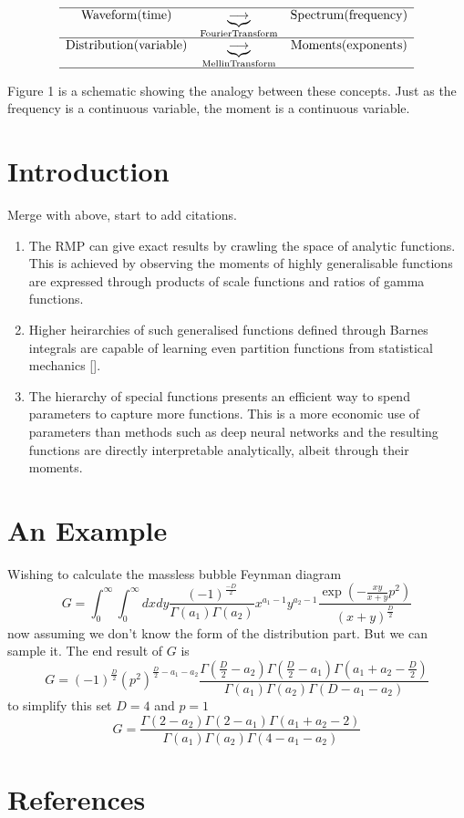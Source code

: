 \documentclass[journal=jcisd8,manuscript=article,layout=onecolumn,pdftex,floatfix,amsmath,amssymb,10pt]{achemso}
\begin{document}
\begin{equation}
\begin{matrix}
\hline
\mathrm{Waveform}(\mathrm{time}) & \underbrace{\longrightarrow}_{\mathrm{Fourier Transform}} & \mathrm{Spectrum}(\mathrm{frequency})\\
\hline
\mathrm{Distribution}(\mathrm{variable}) & \underbrace{\longrightarrow}_{\mathrm{Mellin Transform}} & \mathrm{Moments}(\mathrm{exponents}) \\
\hline
\end{matrix}
\end{equation}

Figure 1 is a schematic showing the analogy between these concepts. Just as the frequency is a continuous variable, the moment is a continuous variable. 



\section{Introduction}
{\color{red} Merge with above, start to add citations.}

\begin{enumerate}
\item The RMP can give exact results by crawling the space of analytic functions. This is achieved by observing the moments of highly generalisable functions are expressed through products of scale functions and ratios of gamma functions.
\item Higher heirarchies of such generalised functions defined through Barnes integrals are capable of learning even partition functions from statistical mechanics [\citep{I function}].
\item The hierarchy of special functions presents an efficient way to spend parameters to capture more functions. This is a more economic use of parameters than methods such as deep neural networks and the resulting functions are directly interpretable analytically, albeit through their moments.
\end{enumerate}

\section{An Example}

Wishing to calculate the massless bubble Feynman diagram
$$
G = \int_0^\infty \int_0^\infty dx dy \frac{(-1)^\frac{-D}{2}}{\Gamma(a_1)\Gamma(a_2)} x^{a_1-1}y^{a_2-1} \frac{\exp(-\frac{x y}{x+y} p^2)}{(x+y)^\frac{D}{2}}
$$
now assuming we don't know the form of the distribution part. But we can sample it. The end result of $G$ is
$$
G = (-1)^\frac{D}{2}(p^2)^{\frac{D}{2}-a_1-a_2}\frac{\Gamma(\frac{D}{2}-a_2)\Gamma(\frac{D}{2}-a_1)\Gamma(a_1+a_2-\frac{D}{2})}{\Gamma(a_1)\Gamma(a_2)\Gamma(D-a_1-a_2)}
$$
to simplify this set $D=4$ and $p=1$
$$
G = \frac{\Gamma(2-a_2)\Gamma(2-a_1)\Gamma(a_1+a_2-2)}{\Gamma(a_1)\Gamma(a_2)\Gamma(4-a_1-a_2)}
$$



\section{References}

\end{document}
